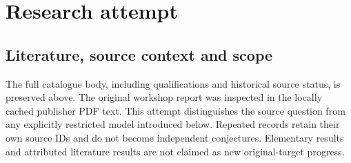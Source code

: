 \documentclass[11pt]{article}
\begin{document}
\section{Research attempt}
\subsection{Literature, source context and scope}
The full catalogue body, including qualifications and historical source status, is preserved above. The original workshop report was inspected in the locally cached publisher PDF text. This attempt distinguishes the source question from any explicitly restricted model introduced below. Repeated records retain their own source IDs and do not become independent conjectures. Elementary results and attributed literature results are not claimed as new original-target progress.
\end{document}
